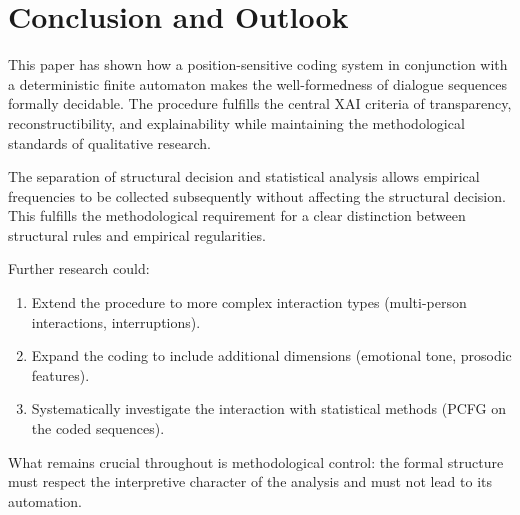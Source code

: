 \documentclass[
  12pt,
  a4paper,
  oneside,
  titlepage
]{article}
\begin{document}
\section{Conclusion and Outlook}

This paper has shown how a position-sensitive coding system in conjunction with 
a deterministic finite automaton makes the well-formedness of dialogue sequences 
formally decidable. The procedure fulfills the central XAI criteria of 
transparency, reconstructibility, and explainability while maintaining the 
methodological standards of qualitative research.

The separation of structural decision and statistical analysis allows empirical 
frequencies to be collected subsequently without affecting the structural 
decision. This fulfills the methodological requirement for a clear distinction 
between structural rules and empirical regularities.

Further research could:

\begin{enumerate}
    \item Extend the procedure to more complex interaction types 
    (multi-person interactions, interruptions).
    
    \item Expand the coding to include additional dimensions 
    (emotional tone, prosodic features).
    
    \item Systematically investigate the interaction with statistical methods 
    (PCFG on the coded sequences).
\end{enumerate}

What remains crucial throughout is methodological control: the formal structure 
must respect the interpretive character of the analysis and must not lead to 
its automation.
\end{document}

